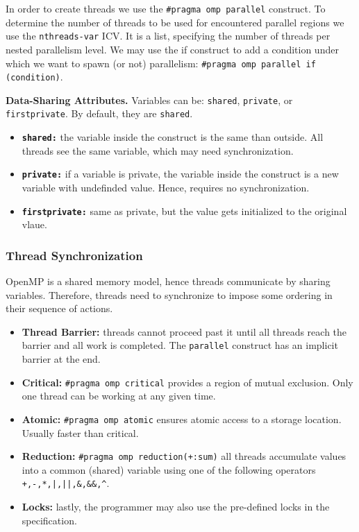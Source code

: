 In order to create threads we use the \texttt{\#pragma omp parallel} construct.
To determine the number of threads to be used for encountered parallel regions we use the \texttt{nthreads-var} ICV.
It is a list, specifying the number of threads per nested parallelism level.
We may use the if construct to add a condition under which we want to spawn (or not) parallelism: \texttt{\#pragma omp parallel if (condition)}.

\textbf{Data-Sharing Attributes.}
Variables can be: \texttt{shared}, \texttt{private}, or \texttt{firstprivate}.
By default, they are \texttt{shared}.
\begin{itemize}
    \item \textbf{\texttt{shared:}} the variable inside the construct is the same than outside. All threads see the same variable, which may need synchronization.
    \item \textbf{\texttt{private:}} if a variable is private, the variable inside the construct is a new variable with undefinded value. Hence, requires no synchronization.
    \item \textbf{\texttt{firstprivate:}} same as private, but the value gets initialized to the original vlaue.
\end{itemize}

\subsubsection{Thread Synchronization}

OpenMP is a shared memory model, hence threads communicate by sharing variables.
Therefore, threads need to synchronize to impose some ordering in their sequence of actions.
\begin{itemize}
    \item \textbf{Thread Barrier:} threads cannot proceed past it until all threads reach the barrier and all work is completed. The \texttt{parallel} construct has an implicit barrier at the end.
    \item \textbf{Critical:} \texttt{\#pragma omp critical} provides a region of mutual exclusion. Only one thread can be working at any given time.
    \item \textbf{Atomic:} \texttt{\#pragma omp atomic} ensures atomic access to a storage location. Usually faster than critical.
    \item \textbf{Reduction:} \texttt{\#pragma omp reduction(+:sum)} all threads accumulate values into a common (shared) variable using one of the following operators \texttt{+,-,*,|,||,\&,\&\&,\^}.
    \item \textbf{Locks:} lastly, the programmer may also use the pre-defined locks in the specification.
\end{itemize}


